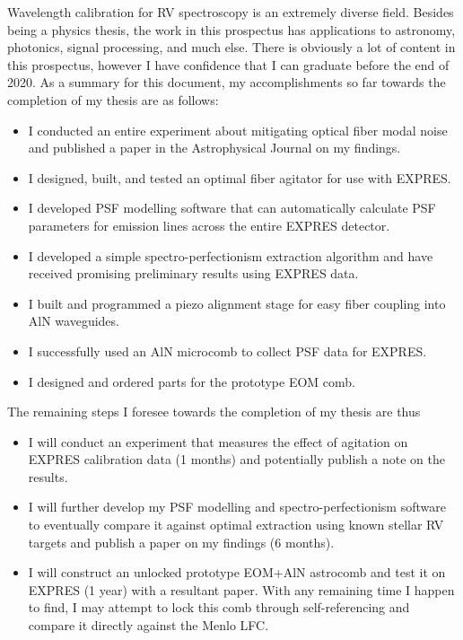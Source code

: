 \documentclass[11pt]{article}
\begin{document}
Wavelength calibration for RV spectroscopy is an extremely diverse field. Besides being a physics thesis, the work in this prospectus has applications to astronomy, photonics, signal processing, and much else. There is obviously a lot of content in this prospectus, however I have confidence that I can graduate before the end of 2020. As a summary for this document, my accomplishments so far towards the completion of my thesis are as follows:
\begin{itemize}
    \item I conducted an entire experiment about mitigating optical fiber modal noise and published a paper in the Astrophysical Journal on my findings.
    \item I designed, built, and tested an optimal fiber agitator for use with EXPRES.
    \item I developed PSF modelling software that can automatically calculate PSF parameters for emission lines across the entire EXPRES detector.
    \item I developed a simple spectro-perfectionism extraction algorithm and have received promising preliminary results using EXPRES data.
    \item I built and programmed a piezo alignment stage for easy fiber coupling into AlN waveguides.
    \item I successfully used an AlN microcomb to collect PSF data for EXPRES.
    \item I designed and ordered parts for the prototype EOM comb.
\end{itemize}
The remaining steps I foresee towards the completion of my thesis are thus
\begin{itemize}
    \item I will conduct an experiment that measures the effect of agitation on EXPRES calibration data (1 months) and potentially publish a note on the results.
    \item I will further develop my PSF modelling and spectro-perfectionism software to eventually compare it against optimal extraction using known stellar RV targets and publish a paper on my findings (6 months).
    \item I will construct an unlocked prototype EOM+AlN astrocomb and test it on EXPRES (1 year) with a resultant paper. With any remaining time I happen to find, I may attempt to lock this comb through self-referencing and compare it directly against the Menlo LFC.
\end{itemize}
\end{document}
